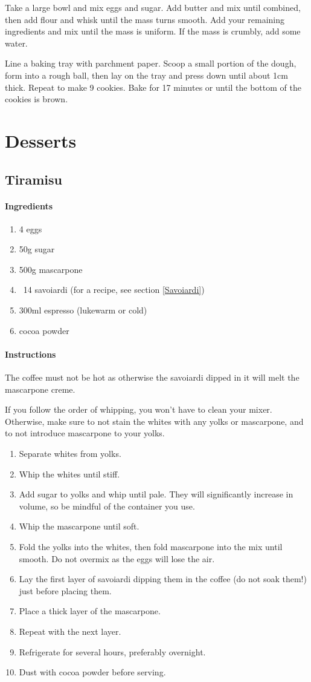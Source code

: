 \documentclass[11pt]{report}
\newcommand{\header}[1]{\subsubsection*{#1}}
\begin{document}
Take a large bowl and mix eggs and sugar. Add butter and mix until combined,
then add flour and whisk until the mass turns smooth. Add your remaining
ingredients and mix until the mass is uniform. If the mass is crumbly, add some
water.

Line a baking tray with parchment paper. Scoop a small portion of the dough,
form into a rough ball, then lay on the tray and press down until about 1cm
thick. Repeat to make 9 cookies. Bake for 17 minutes or until the bottom of the
cookies is brown.

\chapter{Desserts}

\section{Tiramisu}

\header{Ingredients}
\begin{enumerate}
  \item 4 eggs
  \item 50g sugar
  \item 500g mascarpone
  \item ~14 savoiardi (for a recipe, see section \ref{Savoiardi})
  \item 300ml espresso (lukewarm or cold)
  \item cocoa powder
\end{enumerate}

\header{Instructions}
The coffee must not be hot as otherwise the savoiardi dipped in it will melt the
mascarpone creme.

If you follow the order of whipping, you won't have to clean your mixer.
Otherwise, make sure to not stain the whites with any yolks or mascarpone,
and to not introduce mascarpone to your yolks.
\begin{enumerate}
  \item Separate whites from yolks.
  \item Whip the whites until stiff.
  \item Add sugar to yolks and whip until pale. They will significantly
  increase in volume, so be mindful of the container you use.
  \item Whip the mascarpone until soft.
  \item Fold the yolks into the whites, then fold mascarpone into the mix until
   smooth. Do not overmix as the eggs will lose the air.
  \item Lay the first layer of savoiardi dipping them in the coffee (do not soak
   them!) just before placing them.
  \item Place a thick layer of the mascarpone.
  \item Repeat with the next layer.
  \item Refrigerate for several hours, preferably overnight.
  \item Dust with cocoa powder before serving.
\end{enumerate}
\end{document}
